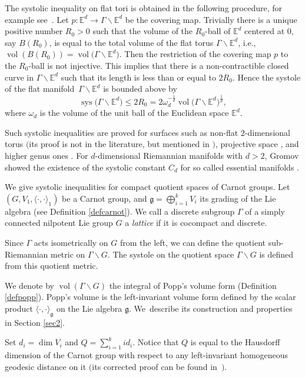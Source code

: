 \documentclass[10pt,a4paper]{amsart}
\numberwithin{equation}{section}
\newcommand{\g}{\mathfrak{g}}
\newcommand{\E}{\mathbb{E}}
\begin{document}
The systolic inequality on flat tori is obtained in the following procedure,
for example see~\cite[Section~1]{gro}.
Let $p\colon\E^d\to \Gamma\backslash \E^d$ be the covering map.
Trivially there is a unique positive number $R_0>0$ such that the volume of the $R_0$-ball of $\E^d$ centered at $0$,
say $B(R_0)$,
is equal to the total volume of the flat torus $\Gamma\backslash \E^d$, i.e., $\operatorname{vol}(B(R_0))=\operatorname{vol}\big(\Gamma\backslash \E^d\big)$.
Then the restriction of the covering map $p$ to the $R_0$-ball is not injective.
This implies that there is a non-contractible closed curve in $\Gamma\backslash \E^d$ such that its length is less than or equal to $2R_0$.
Hence the systole of the flat mani\-fold~$\Gamma\backslash \E^d$ is bounded above by
\[\operatorname{sys}\big(\Gamma\backslash \E^d\big)\leq 2R_0=2\omega_d^{-\frac{1}{d}}\operatorname{vol}\big(\Gamma\backslash \E^d\big)^{\frac{1}{d}},\]
where $\omega_d$ is the volume of the unit ball of the Euclidean space $\E^d$.

Such systolic inequalities are proved for surfaces such as non-flat $2$-dimensional torus $($its proof is not in the literature, but mentioned in \cite{pu}$)$,
projective space \cite{pu},
and higher genus ones \cite{bav, gro2, heb}.
For $d$-dimensional Riemannian manifolds with $d>2$,
Gromov showed the existence of the systolic constant $C_d$ for so called essential manifolds \cite{gro2}.


We give systolic inequalities for compact quotient spaces of Carnot groups.
Let $(G,V_1,\langle\cdot,\cdot\rangle_1)$ be a Carnot group,
and $\g=\bigoplus_{i=1}^k V_i$ its grading of the Lie algebra
(see Definition \ref{defcarnot}).
We call a discrete subgroup $\Gamma$ of a simply connected nilpotent Lie group $G$ a \textit{lattice} if it is cocompact and discrete.

Since $\Gamma$ acts isometrically on $G$ from the left,
we can define the quotient sub-Riemannian metric on $\Gamma\backslash G$.
The systole on the quotient space $\Gamma\backslash G$ is defined from this quotient metric.

We denote by $\operatorname{vol}(\Gamma\backslash G)$ the integral of Popp's volume form (Definition \ref{defpopp}).
Popp's volume is the left-invariant volume form defined by the scalar product $\langle\cdot,\cdot\rangle_{\g}$ on the Lie algebra $\g$.
We~describe its construction and properties in Section \ref{sec2}.

Set $d_i=\dim V_i$ and $Q=\sum_{i=1}^kid_i$.
Notice that $Q$ is equal to the Hausdorff dimension of the Carnot group with respect to any left-invariant homogeneous geodesic distance on it \cite{mit} $($its corrected proof can be found in~\cite{bel}$)$.
\end{document}
